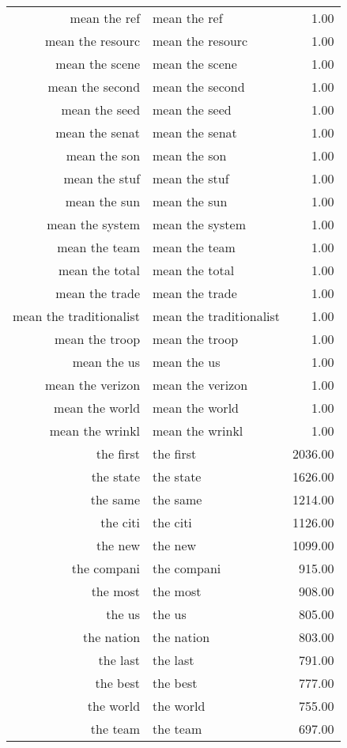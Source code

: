 \begin{table}[ht]
\begin{tabular}{rlr}
  mean the ref & mean the ref & 1.00 \\ 
  mean the resourc & mean the resourc & 1.00 \\ 
  mean the scene & mean the scene & 1.00 \\ 
  mean the second & mean the second & 1.00 \\ 
  mean the seed & mean the seed & 1.00 \\ 
  mean the senat & mean the senat & 1.00 \\ 
  mean the son & mean the son & 1.00 \\ 
  mean the stuf & mean the stuf & 1.00 \\ 
  mean the sun & mean the sun & 1.00 \\ 
  mean the system & mean the system & 1.00 \\ 
  mean the team & mean the team & 1.00 \\ 
  mean the total & mean the total & 1.00 \\ 
  mean the trade & mean the trade & 1.00 \\ 
  mean the traditionalist & mean the traditionalist & 1.00 \\ 
  mean the troop & mean the troop & 1.00 \\ 
  mean the us & mean the us & 1.00 \\ 
  mean the verizon & mean the verizon & 1.00 \\ 
  mean the world & mean the world & 1.00 \\ 
  mean the wrinkl & mean the wrinkl & 1.00 \\ 
  the first & the first & 2036.00 \\ 
  the state & the state & 1626.00 \\ 
  the same & the same & 1214.00 \\ 
  the citi & the citi & 1126.00 \\ 
  the new & the new & 1099.00 \\ 
  the compani & the compani & 915.00 \\ 
  the most & the most & 908.00 \\ 
  the us & the us & 805.00 \\ 
  the nation & the nation & 803.00 \\ 
  the last & the last & 791.00 \\ 
  the best & the best & 777.00 \\ 
  the world & the world & 755.00 \\ 
  the team & the team & 697.00 \\ 

\end{tabular}
\end{table}

